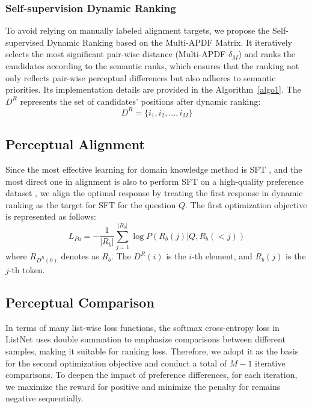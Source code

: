 
\subsubsection{Self-supervision Dynamic Ranking}
To avoid relying on manually labeled alignment targets, we propose the Self-supervised Dynamic Ranking based on the Multi-APDF Matrix.  
It iteratively selects the most significant pair-wise distance (Multi-APDF \(\delta_{M}\)) and ranks the candidates according to the semantic ranks, which ensures that the ranking not only reflects pair-wise perceptual differences but also adheres to semantic priorities.
Its implementation details are provided in the Algorithm~\ref{algo1}.
The \(D^R\) represents the set of candidates' positions after dynamic ranking:
\begin{equation}
    D^R = \{i_1, i_2, \ldots, i_M\}
\end{equation}
\subsection{Perceptual Alignment}
Since the most effective learning for domain knowledge method is SFT \cite{stiennon2020learning}, and the most direct one in alignment is also to perform SFT on a high-quality preference dataset \cite{rafailov2024direct}, 
we align the optimal response by treating the first response in dynamic ranking as the target for SFT for the question \( Q \).
The first optimization objective is represented as follows:
\begin{equation}
   L_{Pa} = - \frac{1}{|R_b|} \sum_{j=1}^{|R_b|} \log P(R_b(j) | Q, R_b(<j))
\end{equation}
where \( R_{D^R(0)}\) denotes as \( R_b \). The \( D^R(i) \) is the \( i \)-th element, and \( R_b(j) \) is the \( j \)-th token.

\subsection{Perceptual Comparison}
In terms of many list-wise loss functions, the softmax cross-entropy loss in ListNet \cite{cao2007learning} uses double summation to emphasize comparisons between different samples, making it suitable for ranking loss. Therefore, we adopt it as the basis for the second optimization objective and conduct a total of \(M-1\) iterative comparisons.
To deepen the impact of preference differences, for each iteration, we maximize the reward for positive and minimize the penalty for remains negative sequentially.

